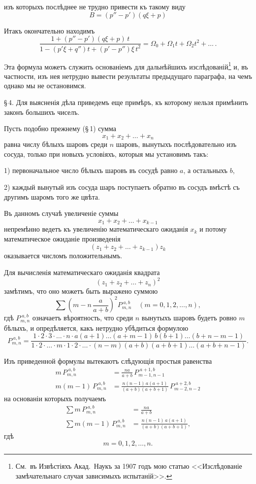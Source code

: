 \documentclass[12pt]{article}
\begin{document}

\noindent изъ которыхъ послѣднее не трудно привести къ такому виду
\[
B = (p'' - p')(q\xi + p)
\]

Итакъ окончательно находимъ
\[
\frac{1 + (p'' - p')(q\xi + p)\,t}{1 - (p'\xi + q'')t + (p' - p'')\xi\,t^2}
= \Omega_0 + \Omega_1 t + \Omega_2 t^2 + \ldots\,.
\]

Эта формула можетъ служить основаніемъ для дальнѣйшихъ изслѣдованій\footnote{См.\ въ Извѣстіяхъ Акад.\ Наукъ за 1907 годъ мою статью <<Изслѣдованіе замѣчательнаго случая зависимыхъ испытаній>>.} и, въ частности, изъ нея нетрудно вывести результаты предыдущаго параграфа, на чемъ однако мы не остановимся.

\S\,4. Для выясненія дѣла приведемъ еще примѣръ, къ которому нельзя примѣнить законъ большихъ чиселъ.

Пусть подобно прежнему (\S\,1) сумма
\[
x_1 + x_2 + \ldots + x_n
\]
равна числу бѣлыхъ шаровъ среди $n$ шаровъ, вынутыхъ послѣдовательно изъ сосуда, только при новыхъ условіяхъ, которыя мы установимъ такъ:

1) первоначальное число бѣлыхъ шаровъ въ сосудѣ равно $a$, а остальныхъ $b$,

2) каждый вынутый изъ сосуда шаръ поступаетъ обратно въ сосудъ вмѣстѣ съ другимъ шаромъ того же цвѣта.

Въ данномъ случаѣ увеличеніе суммы
\[
x_1 + x_2 + \ldots + x_{k-1}
\]
непремѣнно ведетъ къ увеличенію математическаго ожиданія $x_k$ и потому математическое ожиданіе произведенія
\[
(z_1 + z_2 + \ldots + z_{k-1})z_k
\]
оказывается числомъ положительнымъ.


Для вычисленія математическаго ожиданія квадрата
\[
(z_1 + z_2 + \ldots + z_n)^2
\]
замѣтимъ, что оно можетъ быть выражено суммою
\[
\sum \!\left(m - n\,\frac{a}{a+b}\right)^{\!2} P^{\;a,b}_{m,n} \quad (m = 0, 1, 2, \ldots, n),
\]
гдѣ $P^{\;a,b}_{m,n}$ означаетъ вѣроятность, что среди $n$ вынутыхъ шаровъ будетъ ровно $m$ бѣлыхъ, и опредѣляется, какъ нетрудно убѣдиться формулою
\[
P^{\;a,b}_{m,n} = \frac{1\cdot 2\cdot 3\cdot\ldots\cdot n \cdot a(a+1)\ldots(a+m-1)\,b(b+1)\ldots(b+n-m-1)}{1\cdot 2\cdot\ldots\cdot m \cdot 1\cdot 2\cdot\ldots\cdot(n-m)(a+b)(a+b+1)\ldots(a+b+n-1)}.
\]

Изъ приведенной формулы вытекаютъ слѣдующія простыя равенства
\begin{align*}
m\,P^{\;a,b}_{m,n} &= \frac{na}{a+b}\,P^{\;a+1,b}_{m-1,n-1} \\[6pt]
m(m-1)\,P^{\;a,b}_{m,n} &= \frac{n(n-1)\,a(a+1)}{(a+b)(a+b+1)}\,P^{\;a+2,b}_{m-2,n-2}
\end{align*}
на основаніи которыхъ получаемъ
\begin{align*}
\sum m\,P^{\;a,b}_{m,n} &= \frac{na}{a+b} \\[6pt]
\sum m(m-1)\,P^{\;a,b}_{m,n} &= \frac{n(n-1)\,a(a+1)}{(a+b)(a+b+1)},
\end{align*}
гдѣ
\[
m = 0, 1, 2, \ldots, n.
\]
\end{document}
